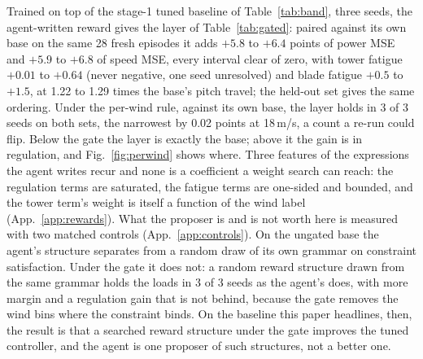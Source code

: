 \documentclass{article}
\begin{document}
Trained on top of the stage-1 tuned baseline of Table~\ref{tab:band}, three seeds, the agent-written reward gives the layer of Table~\ref{tab:gated}: paired against its own base on the same 28 fresh episodes it adds $+5.8$ to $+6.4$ points of power MSE and $+5.9$ to $+6.8$ of speed MSE, every interval clear of zero, with tower fatigue $+0.01$ to $+0.64$ (never negative, one seed unresolved) and blade fatigue $+0.5$ to $+1.5$, at 1.22 to 1.29 times the base's pitch travel; the held-out set gives the same ordering. Under the per-wind rule, against its own base, the layer holds in 3 of 3 seeds on both sets, the narrowest by 0.02 points at 18\,m/s, a count a re-run could flip. Below the gate the layer is exactly the base; above it the gain is in regulation, and Fig.~\ref{fig:perwind} shows where. Three features of the expressions the agent writes recur and none is a coefficient a weight search can reach: the regulation terms are saturated, the fatigue terms are one-sided and bounded, and the tower term's weight is itself a function of the wind label (App.~\ref{app:rewards}). What the proposer is and is not worth here is measured with two matched controls (App.~\ref{app:controls}). On the ungated base the agent's structure separates from a random draw of its own grammar on constraint satisfaction. Under the gate it does not: a random reward structure drawn from the same grammar holds the loads in 3 of 3 seeds as the agent's does, with more margin and a regulation gain that is not behind, because the gate removes the wind bins where the constraint binds. On the baseline this paper headlines, then, the result is that a searched reward structure under the gate improves the tuned controller, and the agent is one proposer of such structures, not a better one.
\end{document}
